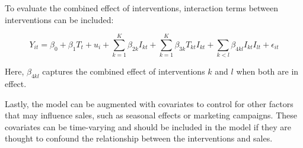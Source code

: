 \documentclass[
]{article}
\begin{document}
To evaluate the combined effect of interventions, interaction terms
between interventions can be included:

\[Y_{it} = \beta_0 + \beta_1 T_t + u_i + \sum_{k=1}^{K} \beta_{2k} I_{kt} + \sum_{k=1}^{K} \beta_{3k} T_{kt} I_{kt} + \sum_{k<l} \beta_{4kl} I_{kt} I_{lt} + \epsilon_{it} \]

Here, \(\beta_{4kl}\) captures the combined effect of interventions
\(k\) and \(l\) when both are in effect.

Lastly, the model can be augmented with covariates to control for other
factors that may influence sales, such as seasonal effects or marketing
campaigns. These covariates can be time-varying and should be included
in the model if they are thought to confound the relationship between
the interventions and sales.
\end{document}

